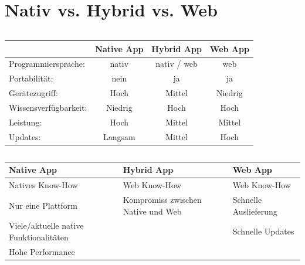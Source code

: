 \documentclass[xcolor=dvipsnames]{beamer}
\begin{document}
\renewcommand{\arraystretch}{1.5}
\section{Nativ vs. Hybrid vs. Web}

\begin{frame}
	\begin{columns}[t,onlytextwidth]
		\begin{tabular}{ l | c | c | c }
			& {\large \textcolor{cordovablue}{Native App}} & {\large \textcolor{cordovablue}{Hybrid App}} & {\large \textcolor{cordovablue}{Web App}} \\
			\hline
			Programmiersprache: & nativ & nativ / web & web \\
			Portabilität: & nein & ja & ja \\
			Gerätezugriff: & Hoch & Mittel & Niedrig \\
			Wissensverfügbarkeit: & Niedrig & Hoch & Hoch \\
			Leistung: & Hoch & Mittel & Mittel \\
			Updates: & Langsam & Mittel & Hoch \\
		\end{tabular}
	\end{columns}
\end{frame}

\begin{frame}
	\begin{columns}[t,onlytextwidth]
		\begin{tabular}{ p{3.2cm} | p{3.2cm} | p{3.2cm} }
			{\large \textcolor{cordovablue}{Native App}} & {\large \textcolor{cordovablue}{Hybrid App}} & {\large \textcolor{cordovablue}{Web App}} \\
			\hline
			Natives Know-How & Web Know-How & Web Know-How \\
			Nur eine Plattform & Kompromiss zwischen Native und Web & Schnelle Auslieferung \\
			Viele/aktuelle native Funktionalitäten &  & Schnelle Updates \\
			Hohe Performance &  &  \\
		\end{tabular}
	\end{columns}
\end{frame}
\end{document}
